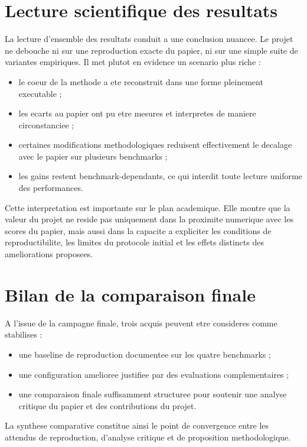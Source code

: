 \section{Lecture scientifique des resultats}

La lecture d'ensemble des resultats conduit a une conclusion nuancee. Le projet
ne debouche ni sur une reproduction exacte du papier, ni sur une simple suite
de variantes empiriques. Il met plutot en evidence un scenario plus riche :
\begin{itemize}[leftmargin=*]
  \item le coeur de la methode a ete reconstruit dans une forme pleinement
  executable ;
  \item les ecarts au papier ont pu etre mesures et interpretes de maniere
  circonstanciee ;
  \item certaines modifications methodologiques reduisent effectivement le
  decalage avec le papier sur plusieurs benchmarks ;
  \item les gains restent benchmark-dependants, ce qui interdit toute lecture
  uniforme des performances.
\end{itemize}

Cette interpretation est importante sur le plan academique. Elle montre que la
valeur du projet ne reside pas uniquement dans la proximite numerique avec les
scores du papier, mais aussi dans la capacite a expliciter les conditions de
reproductibilite, les limites du protocole initial et les effets distincts des
ameliorations proposees.

\section{Bilan de la comparaison finale}

A l'issue de la campagne finale, trois acquis peuvent etre consideres comme
stabilises :
\begin{itemize}[leftmargin=*]
  \item une baseline de reproduction documentee sur les quatre benchmarks ;
  \item une configuration amelioree justifiee par des evaluations
  complementaires ;
  \item une comparaison finale suffisamment structuree pour soutenir une
  analyse critique du papier et des contributions du projet.
\end{itemize}

La synthese comparative constitue ainsi le point de convergence entre les
attendus de reproduction, d'analyse critique et de proposition methodologique.
